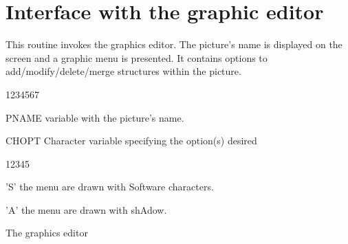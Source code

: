 \section{Interface with the graphic editor}
\Action
This routine invokes the graphics editor. The picture's name is displayed on the
screen and a graphic menu is presented. It contains options to
add/modify/delete/merge structures within the picture.
\Pdesc
\begin{DLtt}{1234567}
\item[PNAME]  variable with the picture's name.
\item[CHOPT] Character variable specifying the option(s) desired
\begin{DLtt}{12345}
\item['S'] the menu are drawn with Software characters.
\item['A'] the menu are drawn with shAdow.
\end{DLtt}
\end{DLtt}

\begin{minipage}{\textwidth}
\begin{Fighere}
\begin{center}
\mbox{}
\end{center}
\caption{The graphics editor}
\label{fig-GED}
\end{Fighere}       
\end{minipage}
